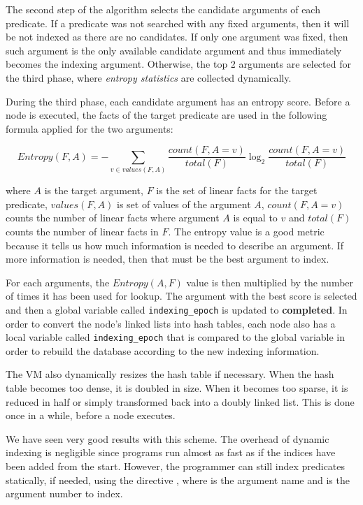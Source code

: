 The second step of the algorithm selects the candidate arguments of each
predicate. If a predicate was not searched with any fixed arguments, then it
will be not indexed as there are no candidates. If only one argument was fixed,
then such argument is the only available candidate argument and thus immediately
becomes the indexing argument. Otherwise, the top 2 arguments are selected for
the third phase, where \emph{entropy statistics} are collected dynamically.

During the third phase, each candidate argument has an entropy score. Before a
node is executed, the facts of the target predicate are used in the following
formula applied for the two arguments:

\[
Entropy(F, A) = - \sum_{v \in values(F, A)} \frac{count(F, A = v)}{total(F)} \log_2 \frac{count(F, A = v)}{total(F)}
\]

\noindent where $A$ is the target argument, $F$ is the set of linear facts for
the target predicate, $values(F, A)$ is set of values of the argument $A$,
$count(F, A = v)$ counts the number of linear facts where argument $A$ is equal
to $v$ and $total(F)$ counts the number of linear facts in $F$.  The entropy
value is a good metric because it tells us how much information is needed to
describe an argument. If more information is needed, then that must be the best
argument to index.

For each arguments, the $Entropy(A, F)$ value is then multiplied by the number
of times it has been used for lookup. The argument with the best score is
selected and then a global variable called \texttt{indexing\_epoch} is updated
to \textbf{completed}. In order to convert the node's linked lists into hash
tables, each node also has a local variable called \texttt{indexing\_epoch} that
is compared to the global variable in order to rebuild the database according to
the new indexing information.

The VM also dynamically resizes the hash table if necessary. When the hash table
becomes too dense, it is doubled in size. When it becomes too sparse, it is
reduced in half or simply transformed back into a doubly linked list. This is
done once in a while, before a node executes.

We have seen very good results with this scheme. The overhead of dynamic
indexing is negligible since programs run almost as fast as if the indices have
been added from the start. However, the programmer can still index predicates
statically, if needed, using the directive , where
 is the argument name and  is the argument number to index.
